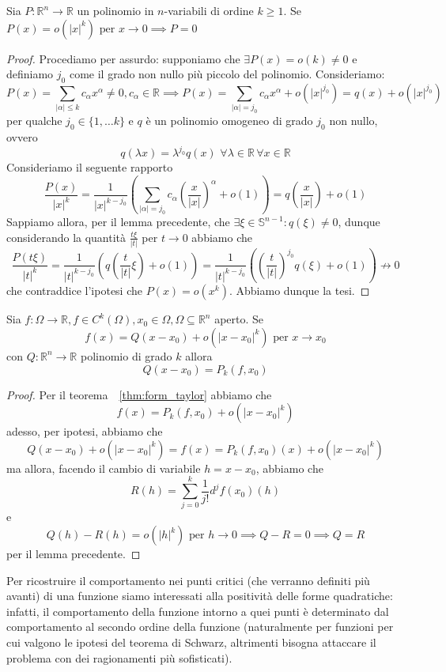 \begin{lemma}
Sia $P:\mathbb{R}^n \to \mathbb{R}$ un polinomio in $n$-variabili di ordine $k \geq 1$. Se $P(x) = o(|x|^k) \text{ per } x \to 0 \implies P = 0$
\end{lemma}
\begin{proof} Procediamo per assurdo: supponiamo che $\exists P(x) = o(k) \neq 0$ e definiamo $j_0$ come il grado non nullo più piccolo del polinomio. Consideriamo:
$$
P(x) = \sum_{|\alpha| \leq k} c_{\alpha}x^{\alpha} \neq 0, c_{\alpha} \in \mathbb{R} \implies P(x) = \sum_{|\alpha| = j_0} c_{\alpha} x^{\alpha} + o(|x|^{j_0}) = q(x) + o(|x|^{j_0})
$$
per qualche $j_0 \in \{1, \ldots k \}$ e $q$ è un polinomio omogeneo di grado $j_0$ non nullo, ovvero 
$$
q(\lambda x) = \lambda^{j_0} q(x) \, \, \forall \lambda \in \mathbb{R} \, \forall x \in \mathbb{R}
$$
Consideriamo il seguente rapporto
$$
\frac{P(x)}{|x|^k} = \frac{1}{|x|^{k-j_0}} \left(\sum_{|\alpha|=j_0} c_{\alpha} \left( \frac{x}{|x|} \right)^{\alpha} + o(1) \right) = q \left( \frac{x}{|x|} \right)+o(1)
$$
Sappiamo allora, per il lemma precedente, che $\exists \xi \in \mathbb{S}^{n-1}: q(\xi) \neq 0$, dunque considerando la quantità $\frac{t\xi}{|t|}$ per $t \to 0$ abbiamo che
$$
\frac{P(t\xi)}{|t|^k} = \frac{1}{|t|^{k-j_0}} \left(q \left( \frac{t}{|t|}\xi \right) + o(1) \right) = \frac{1}{|t|^{k-j_0}} \left( \left( \frac{t}{|t|} \right)^{j_0} q(\xi) + o(1) \right) \not\to 0
$$
che contraddice l'ipotesi che $P(x) = o(x^k)$. Abbiamo dunque la tesi.
\end{proof}
\begin{theorem}
Sia $f: \Omega \to \mathbb{R}, f \in C^k(\Omega), x_0 \in \Omega, \Omega \subseteq \mathbb{R}^n$ aperto. Se
$$
f(x) = Q(x-x_0) + o(|x-x_0|^k) \text{ per } x \to x_0
$$
con $Q: \mathbb{R}^n \to \mathbb{R}$ polinomio di grado $k$ allora
$$
Q(x - x_0) = P_k(f, x_0)
$$
\end{theorem}
\begin{proof}
Per il teorema~~\ref{thm:form_taylor} abbiamo che
$$
f(x) = P_k(f, x_0) + o(|x-x_0|^k)
$$
adesso, per ipotesi, abbiamo che
$$
Q(x-x_0)+o(|x-x_0|^k) = f(x) = P_k(f, x_0)(x) + o(|x-x_0|^k)
$$
ma allora, facendo il cambio di variabile $h = x-x_0$, abbiamo che
$$
R(h) = \sum_{j=0}^k \frac{1}{j!} d^j f(x_0)(h)
$$
e
$$
Q(h) - R(h) = o(|h|^k) \text{ per } h \to 0 \implies Q - R = 0 \implies Q=R
$$
per il lemma precedente.
\end{proof}
Per ricostruire il comportamento nei punti critici (che verranno definiti più avanti) di una funzione siamo interessati alla positività delle forme quadratiche: infatti, il comportamento della funzione intorno a quei punti è determinato dal comportamento al secondo ordine della funzione (naturalmente per funzioni per cui valgono le ipotesi del teorema di Schwarz, altrimenti bisogna attaccare il problema con dei ragionamenti più sofisticati). \\

